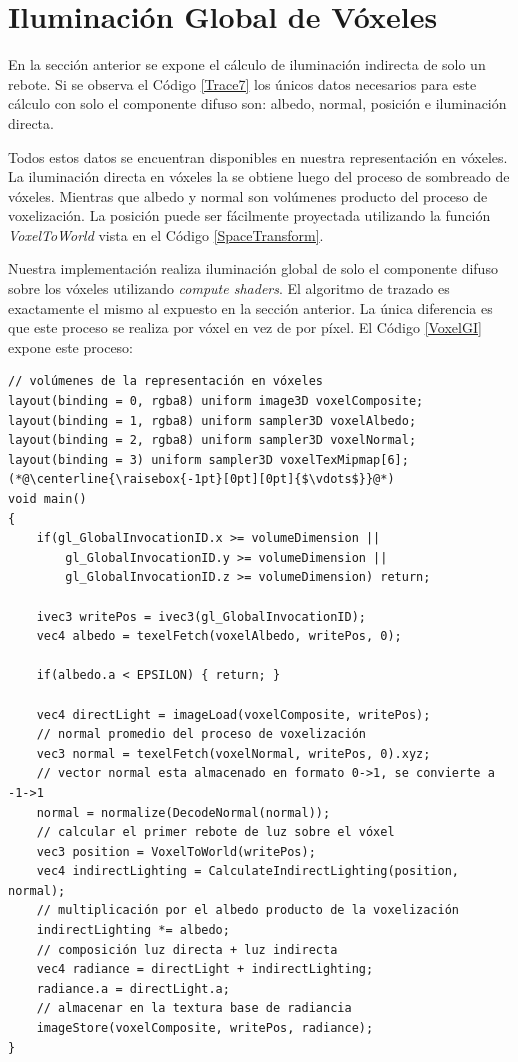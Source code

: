 \section{Iluminación Global de Vóxeles} %
\label{sec:iluminacion_global_de_voxeles_impl}
En la sección anterior se expone el cálculo de iluminación indirecta de solo un rebote. Si se observa el Código \ref{Trace7} los únicos datos necesarios para este cálculo con solo el componente difuso son: albedo, normal, posición e iluminación directa.

Todos estos datos se encuentran disponibles en nuestra representación en vóxeles. La iluminación directa en vóxeles la se obtiene luego del proceso de sombreado de vóxeles. Mientras que albedo y normal son volúmenes producto del proceso de voxelización. La posición puede ser fácilmente proyectada utilizando la función \emph{VoxelToWorld} vista en el Código \ref{SpaceTransform}.

Nuestra implementación realiza iluminación global de solo el componente difuso sobre los vóxeles utilizando \emph{compute shaders}. El algoritmo de trazado es exactamente el mismo al expuesto en la sección anterior. La única diferencia es que este proceso se realiza por vóxel en vez de por píxel. El Código \ref{VoxelGI} expone este proceso:
\\
\begin{lstlisting}[caption={Calculo de iluminación global sobre vóxeles.}, label=VoxelGI]
// volúmenes de la representación en vóxeles
layout(binding = 0, rgba8) uniform image3D voxelComposite;
layout(binding = 1, rgba8) uniform sampler3D voxelAlbedo;
layout(binding = 2, rgba8) uniform sampler3D voxelNormal;
layout(binding = 3) uniform sampler3D voxelTexMipmap[6];
(*@\centerline{\raisebox{-1pt}[0pt][0pt]{$\vdots$}}@*)
void main()
{
    if(gl_GlobalInvocationID.x >= volumeDimension ||
        gl_GlobalInvocationID.y >= volumeDimension ||
        gl_GlobalInvocationID.z >= volumeDimension) return;

    ivec3 writePos = ivec3(gl_GlobalInvocationID);
    vec4 albedo = texelFetch(voxelAlbedo, writePos, 0);

    if(albedo.a < EPSILON) { return; }

    vec4 directLight = imageLoad(voxelComposite, writePos);
    // normal promedio del proceso de voxelización
    vec3 normal = texelFetch(voxelNormal, writePos, 0).xyz;
    // vector normal esta almacenado en formato 0->1, se convierte a -1->1
    normal = normalize(DecodeNormal(normal));
    // calcular el primer rebote de luz sobre el vóxel
    vec3 position = VoxelToWorld(writePos);
    vec4 indirectLighting = CalculateIndirectLighting(position, normal);
    // multiplicación por el albedo producto de la voxelización
    indirectLighting *= albedo;
    // composición luz directa + luz indirecta
    vec4 radiance = directLight + indirectLighting;
    radiance.a = directLight.a;
    // almacenar en la textura base de radiancia
    imageStore(voxelComposite, writePos, radiance);
}
\end{lstlisting}


